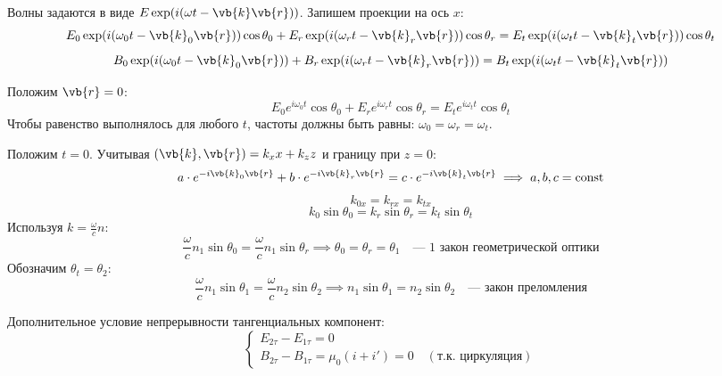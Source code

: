 Волны задаются в виде $E \exp(i(\omega t - \vb{k}\vb{r}))$. Запишем проекции на ось $x$:
\begin{equation*}
	E_0 \exp(i(\omega_0 t - \vb{k}_0 \vb{r})) \cos\theta_0 + E_r \exp(i(\omega_r t - \vb{k}_r \vb{r})) \cos\theta_r = E_t \exp(i(\omega_t t - \vb{k}_t \vb{r})) \cos\theta_t
\end{equation*}
\begin{equation*}
	B_0 \exp(i(\omega_0 t - \vb{k}_0 \vb{r})) + B_r \exp(i(\omega_r t - \vb{k}_r \vb{r})) = B_t \exp(i(\omega_t t - \vb{k}_t \vb{r}))
\end{equation*}

Положим $\vb{r} = 0$:
\begin{equation*}
	E_0 e^{i\omega_0 t} \cos\theta_0 + E_r e^{i\omega_r t} \cos\theta_r = E_t e^{i\omega_t t} \cos\theta_t
\end{equation*}
Чтобы равенство выполнялось для любого $t$, частоты должны быть равны: $\omega_0 = \omega_r = \omega_t$.

Положим $t = 0$. Учитывая $(\vb{k}, \vb{r}) = k_x x + k_z z$ и границу при $z=0$:
\begin{equation*}
	a \cdot e^{-i \vb{k}_0 \vb{r}} + b \cdot e^{-i \vb{k}_r \vb{r}} = c \cdot e^{-i \vb{k}_t \vb{r}} \implies a, b, c = \text{const}
\end{equation*}
\begin{equation*}
	k_{0x} = k_{rx} = k_{tx}
\end{equation*}
\begin{equation*}
	k_0 \sin\theta_0 = k_r \sin\theta_r = k_t \sin\theta_t
\end{equation*}
Используя $k = \frac{\omega}{c} n$:
\begin{equation*}
	\frac{\omega}{c} n_1 \sin\theta_0 = \frac{\omega}{c} n_1 \sin\theta_r \implies \theta_0 = \theta_r = \theta_1 \quad \text{--- 1 закон геометрической оптики}
\end{equation*}
Обозначим $\theta_t = \theta_2$:
\begin{equation*}
	\frac{\omega}{c} n_1 \sin\theta_1 = \frac{\omega}{c} n_2 \sin\theta_2 \implies n_1 \sin\theta_1 = n_2 \sin\theta_2 \quad \text{--- закон преломления}
\end{equation*}

Дополнительное условие непрерывности тангенциальных компонент:
\begin{equation*}
	\begin{cases}
		E_{2\tau} - E_{1\tau} = 0 \\
		B_{2\tau} - B_{1\tau} = \mu_0(i + i') = 0 \quad (\text{т.к. циркуляция})
	\end{cases}
\end{equation*}

